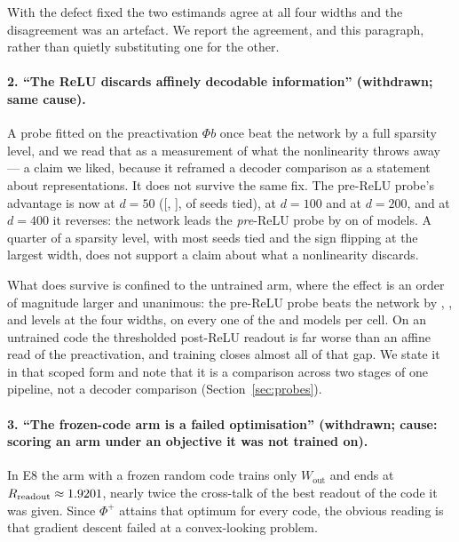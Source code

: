 With the defect fixed the two estimands agree at all four widths and the disagreement was an
artefact. We report the agreement, and this paragraph, rather than quietly substituting one for the
other.

\paragraph{2. ``The ReLU discards affinely decodable information'' (withdrawn; same cause).} A probe
fitted on the preactivation $\Phi b$ once beat the network by a full sparsity level, and we read that
as a measurement of what the nonlinearity throws away --- a claim we liked, because it reframed a
decoder comparison as a statement about representations. It does not survive the same fix. The
pre-ReLU probe's advantage is now \PrimLfourFiftyPreDiff{} at $d=50$
([\PrimLfourFiftyPreCiLow, \PrimLfourFiftyPreCiHigh], \PrimLfourFiftyPreTies{} of \EsevenSeeds{}
seeds tied), \PrimLfourHundredPreDiff{} at $d=100$ and \PrimLfourTwoHundredPreDiff{} at $d=200$, and
at $d=400$ it reverses: the network leads the \emph{pre}-ReLU probe by
\PrimLfourFourHundredPreDiff{} on \PrimLfourFourHundredPreNetWins{} of \ScSeeds{} models. A quarter
of a sparsity level, with most seeds tied and the sign flipping at the largest width, does not
support a claim about what a nonlinearity discards.

What does survive is confined to the untrained arm, where the effect is an order of magnitude larger
and unanimous: the pre-ReLU probe beats the network by \PrimRandFiftyPreDiff{},
\PrimRandHundredPreDiff{}, \PrimRandTwoHundredPreDiff{} and \PrimRandFourHundredPreDiff{} levels at
the four widths, on every one of the \PrimRandFourHundredPreProbeWins{} and \EsevenSeeds{} models per
cell. On an untrained code the thresholded post-ReLU readout is far worse than an affine read of the
preactivation, and training closes almost all of that gap. We state it in that scoped form and note
that it is a comparison across two stages of one pipeline, not a decoder comparison
(Section~\ref{sec:probes}).

\paragraph{3. ``The frozen-code arm is a failed optimisation'' (withdrawn; cause: scoring an arm
under an objective it was not trained on).} In E8 the arm with a frozen random code trains only
$W_{\mathrm{out}}$ and ends at $R_{\mathrm{readout}}\approx1.9201$, nearly twice the
cross-talk of the best readout of the code it was given. Since $\Phi^{+}$ attains that optimum for
every code, the obvious reading is that gradient descent failed at a convex-looking problem.

